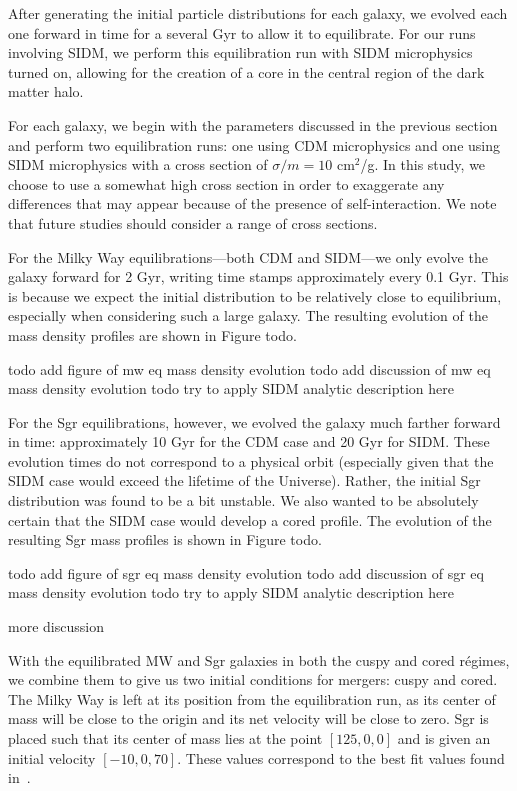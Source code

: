 After generating the initial particle distributions for each galaxy, we
evolved each one forward in time for a several Gyr to allow it to
equilibrate. For our runs involving SIDM, we perform this equilibration
run with SIDM microphysics turned on, allowing for the creation of a
core in the central region of the dark matter halo.

For each galaxy, we begin with the parameters discussed in the previous
section and perform two equilibration runs: one using CDM microphysics
and one using SIDM microphysics with a cross section of
\(\sigma / m = 10\) cm\(^2\)/g. In this study, we choose to use a
somewhat high cross section in order to exaggerate any differences that
may appear because of the presence of self-interaction. We note that
future studies should consider a range of cross sections.

For the Milky Way equilibrations---both CDM and SIDM---we only evolve
the galaxy forward for 2 Gyr, writing time stamps approximately every
0.1 Gyr. This is because we expect the initial distribution to be
relatively close to equilibrium, especially when considering such a
large galaxy. The resulting evolution of the mass density profiles are
shown in Figure todo.

todo add figure of mw eq mass density evolution todo add discussion of
mw eq mass density evolution todo try to apply SIDM analytic description
here

For the Sgr equilibrations, however, we evolved the galaxy much farther
forward in time: approximately 10 Gyr for the CDM case and 20 Gyr for
SIDM. These evolution times do not correspond to a physical orbit
(especially given that the SIDM case would exceed the lifetime of the
Universe). Rather, the initial Sgr distribution was found to be a bit
unstable. We also wanted to be absolutely certain that the SIDM case
would develop a cored profile. The evolution of the resulting Sgr mass
profiles is shown in Figure todo.

todo add figure of sgr eq mass density evolution todo add discussion of
sgr eq mass density evolution todo try to apply SIDM analytic
description here

more discussion

With the equilibrated MW and Sgr galaxies in both the cuspy and cored
régimes, we combine them to give us two initial conditions for mergers:
cuspy and cored. The Milky Way is left at its position from the
equilibration run, as its center of mass will be close to the origin and
its net velocity will be close to zero. Sgr is placed such that its
center of mass lies at the point \([125, 0, 0]\) and is given an initial
velocity \([-10,0,70]\). These values correspond to the best fit values
found in~\cite{dierickx_predicted_2017}.
